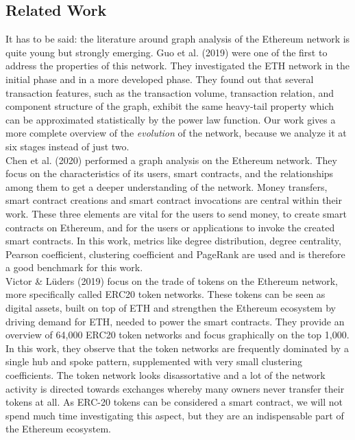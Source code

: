 \documentclass[10pt,a4paper]{article}
\begin{document}
\begin{multicols}{2}
\section{Related Work}
It has to be said: the literature around graph analysis of the Ethereum network is quite young but strongly emerging. Guo et al. (2019) \cite{GUO201958} were one of the first to address the properties of this network. They investigated the ETH network in the initial phase and in a more developed phase. They found out that several transaction features, such as the transaction volume, transaction relation, and component structure of the graph, exhibit the same heavy-tail property which can be approximated statistically by the power law function. Our work gives a more complete overview of the \textit{evolution} of the network, because we analyze it at six stages instead of just two.\\
Chen et al. (2020) \cite{chenEthereum} performed a graph analysis on the Ethereum network. They focus on the characteristics of its users, smart contracts, and the relationships among them to get a deeper understanding of the network. Money transfers, smart contract creations and smart contract invocations are central within their work. These three elements are vital for the users to send money, to create smart contracts on Ethereum, and for the users or applications to invoke the created smart contracts. In this work, metrics like degree distribution, degree centrality, Pearson coefficient, clustering coefficient and PageRank are used and is therefore a good benchmark for this work.\\
Victor \& Lüders (2019) \cite{inbook} focus on the trade of tokens on the Ethereum network, more specifically called ERC20 token networks. These tokens can be seen as digital assets, built on top of ETH and strengthen the Ethereum ecosystem by driving demand for ETH, needed to power the smart contracts. They provide an overview of 64,000 ERC20 token networks and focus graphically on the top 1,000. In this work, they observe that the token networks are frequently dominated by a single hub and spoke pattern, supplemented with very small clustering coefficients. The token network looks disassortative and a lot of the network activity is directed towards exchanges whereby many owners never transfer their tokens at all. As ERC-20 tokens can be considered a smart contract, we will not spend much time investigating this aspect, but they are an indispensable part of the Ethereum ecosystem.



\end{multicols}
\end{document}
